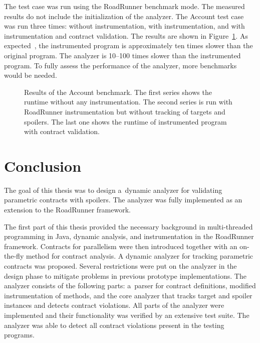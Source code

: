 The test case was run using the RoadRunner benchmark mode. The measured results
do not include the initialization of the analyzer. The Account test case was run
three times: without instrumentation, with instrumentation, and with
instrumentation and contract validation. The results are shown in
Figure~\ref{performancefig}. As expected~\cite{RoadRunner}, the instrumented
program is approximately ten times slower than the original program. The
analyzer is 10--100 times slower than the instrumented program. To fully assess
the performance of the analyzer, more benchmarks would be needed.

\begin{figure}[H]
    \begin{center}
    \label{performancefig}
    
    \caption{Results of the Account benchmark. The first series shows the
        runtime without any instrumentation. The second series is run with
        RoadRunner instrumentation but without tracking of targets and spoilers.
        The last one shows the runtime of instrumented program with contract
        validation.}
    \end{center}
\end{figure}



\chapter{Conclusion}

The goal of this thesis was to design a~dynamic analyzer for validating
parametric contracts with spoilers. The analyzer was fully implemented as an
extension to the RoadRunner framework.

The first part of this thesis provided the necessary background in
multi-threaded programming in Java, dynamic analysis, and instrumentation in the
RoadRunner framework. Contracts for parallelism were then introduced together
with an on-the-fly method for contract analysis. A dynamic analyzer for tracking
parametric contracts was proposed. Several restrictions were put on the analyzer
in the design phase to mitigate problems in previous prototype implementations.
The analyzer consists of the following parts: a~parser for contract definitions,
modified instrumentation of methods, and the core analyzer that tracks target
and spoiler instances and detects contract violations. All parts of the analyzer
were implemented and their functionality was verified by an extensive test
suite. The analyzer was able to detect all contract violations present in the
testing programs.

